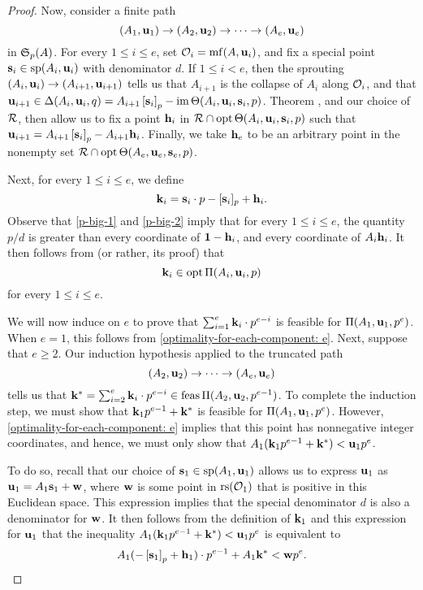 \documentclass[11pt]{amsart}
\newcommand{\denom}{d} %
\begin{document}
\begin{proof}
Now, consider a finite path \[ (A_1, \mathbf{u}_1) \to (A_2, \mathbf{u}_2) \to \cdots \to (A_e, \mathbf{u}_e) \] in $\mathfrak{S}_p(A)$.  For every $1 \leq i \leq e$, set $\mathcal{O}_i = \operatorname{mf}(A, \mathbf{u}_i)$, and fix a special point $\mathbf{s}_i \in \operatorname{sp}(A_i, \mathbf{u}_i)$ with denominator $\denom$.  If $1 \leq i < e$, then the sprouting $(A_i, \mathbf{u}_i) \to (A_{i+1}, \mathbf{u}_{i+1})$ tells us that $A_{i+1}$ is the collapse of $A_i$ along $\mathcal{O}_i$, and that $\mathbf{u}_{i+1} \in \Delta(A_i, \mathbf{u}_i, q) = A_{i+1} \left[ \mathbf{s}_i \right]_p - \operatorname{im}  \Theta( A_i, \mathbf{u}_i, \mathbf{s}_i, p)$.  Theorem , and our choice of $\mathcal{R}$, then allow us to fix a point $\mathbf{h}_i$ in $\mathcal{R} \cap \operatorname{opt} \Theta ( A_i, \mathbf{u}_i, \mathbf{s}_i, p)$ such that
$\mathbf{u}_{i+1} = A_{i+1} \left[ \mathbf{s}_i \right]_p - A_{i+1} \mathbf{h}_i$.  Finally, we take $\mathbf{h}_e$ to be an arbitrary point in the nonempty set $\mathcal{R} \cap \operatorname{opt} \Theta ( A_e, \mathbf{u}_e, \mathbf{s}_e, p)$.


Next, for every $1 \leq i \leq e$,  we define
  \[
\mathbf{k}_i = \mathbf{s}_i \cdot p - [\mathbf{s}_i]_p + \mathbf{h}_i.
\]
Observe that \eqref{p-big-1} and \eqref{p-big-2} imply that for every $1 \leq i \leq e$, the quantity $p/\denom$ is greater than every coordinate of $\mathbf{1}-\mathbf{h}_i$, and every coordinate of $A_i \mathbf{h}_i$.  It then follows from  (or rather, its proof) that
\begin{equation}
\label{optimality-for-each-component: e}
\mathbf{k}_i \in \operatorname{opt} \Pi(A_i, \mathbf{u}_i,p)
\end{equation}
for every $1 \leq i \leq e$.

We will now induce on $e$ to prove that $\sum_{i=1}^e \mathbf{k}_i \cdot p^{e-i}$ is feasible for $\Pi(A_1, \mathbf{u}_1, p^e)$.  When $e = 1$, this follows from \eqref{optimality-for-each-component: e}.  Next, suppose that $e \geq 2$.  Our induction hypothesis applied to the truncated path
\[ (A_2, \mathbf{u}_2) \to \cdots \to (A_e, \mathbf{u}_e) \]
%
tells us that $\mathbf{k}^{\ast} = \sum_{i=2}^e \mathbf{k}_i \cdot p^{e-i} \in \operatorname{feas} \Pi(A_2, \mathbf{u}_2, p^{e-1})$.  To complete the induction step, we must show that $\mathbf{k}_1 p^{e-1} + \mathbf{k}^{\ast}$ is feasible for $\Pi(A_1, \mathbf{u}_1, p^e)$.  However,  \eqref{optimality-for-each-component: e} implies that this point has nonnegative integer coordinates, and hence, we must only show that $A_1 ( \mathbf{k}_1 p^{e-1} + \mathbf{k}^{\ast} ) < \mathbf{u}_1 p^e$.

To do so,  recall that our choice of $\mathbf{s}_1 \in \operatorname{sp}(A_1, \mathbf{u}_1)$ allows us to express $\mathbf{u}_1$ as
$\mathbf{u}_1 = A_1 \mathbf{s}_1 + \mathbf{w}$, where $\mathbf{w}$ is some point in $\operatorname{rs}(\mathcal{O}_1)$ that is positive in this Euclidean space.  This expression implies that the special denominator $\denom$ is also a denominator for $\mathbf{w}$.  It then follows from the definition of $\mathbf{k}_1$ and this expression for $\mathbf{u}_1$ that the inequality $A_1 ( \mathbf{k}_1 p^{e-1} + \mathbf{k}^{\ast} ) < \mathbf{u}_1 p^e$ is equivalent to
%
\begin{equation}
\label{target-inequality: e}
  A_1( - \left[ \mathbf{s}_1 \right]_p + \mathbf{h}_1 ) \cdot p^{e-1} + A_1\mathbf{k}^{\ast} < \mathbf{w} p^e.
\end{equation}


\end{proof}
\end{document}
